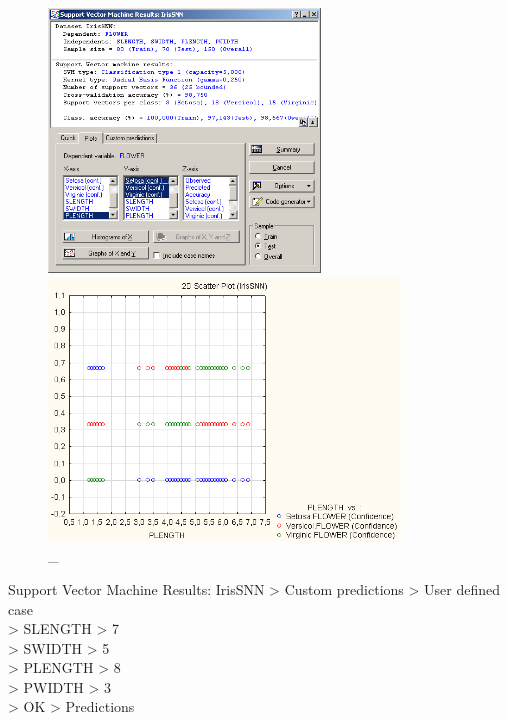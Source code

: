 \begin{figure}[!h]
  \centering

  \begin{minipage}{0.49\textwidth}
    \centering

    \includegraphics[height=7cm]
    {inc/ex_19.PNG}

    \caption{\_}

    \label{fig:19}
  \end{minipage}
  \begin{minipage}{0.49\textwidth}
    \centering

    \includegraphics[height=7cm]
    {inc/ex_20.PNG}

    \caption{\_}

    \label{fig:20}
  \end{minipage}
\end{figure}

Support Vector Machine Results: IrisSNN > Custom predictions > User defined case \\
> SLENGTH > 7 \\
> SWIDTH > 5 \\
> PLENGTH > 8 \\
> PWIDTH > 3 \\
> OK > Predictions

